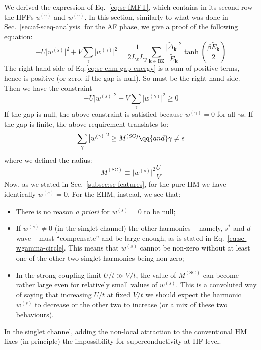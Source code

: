 We derived the expression of Eq.~\eqref{eq:sc-fMFT}, which contains in its second row the HFPs $u^{(\gamma)}$ and $w^{(\gamma)}$. In this section, similarly to what was done in Sec.~\ref{sec:af-sceq-analysis} for the AF phase, we give a proof of the following equation:
\begin{equation}\label{eq:sc-ehm-gap-energy}
	-U \big|
		w^{(s)}
	\big|^2 + V \sum_\gamma \big|
		w^{(\gamma)}
	\big|^2 = \frac{1}{2L_x L_y} \sum_{\mathbf{k}\in\mathrm{BZ}} \frac{\big| \tilde{\Delta}_\mathbf{k} \big|^2 }{\tilde{E}_\mathbf{k}} \tanh(\frac{\beta\tilde{E}_\mathbf{k}}{2})
\end{equation}
The right-hand side of Eq.\eqref{eq:sc-ehm-gap-energy} is a sum of positive terms, hence is positive (or zero, if the gap is null). So must be the right hand side. Then we have the constraint
\[
-U \big|
w^{(s)}
\big|^2 + V \sum_\gamma \big|
w^{(\gamma)}
\big|^2 \ge 0
\]
If the gap is null, the above constraint is satisfied because $w^{(\gamma)}=0$ for all $\gamma$s. If the gap is finite, the above requirement translates to:
\begin{equation}\label{eq:sc-wgamma-circle}
	\sum_{\gamma} \big| w^{(\gamma)} \big|^2 \ge M^{(\mathrm{SC})}
	\qq{and}
	\gamma \neq s
\end{equation}
where we defined the radius:
\[
M^{(\mathrm{SC})} \equiv \big| w^{(s)} \big|^2 \frac U V
\]
Now, as we stated in Sec.~\ref{subsec:sc-features}, for the pure HM we have identically $w^{(s)}=0$. For the EHM, instead, we see that:
\begin{itemize}
	\item There is no reason \textit{a priori} for $w^{(s)}=0$ to be null;
	\item If $w^{(s)}\neq0$ (in the singlet channel) the other harmonics -- namely, $s^*$ and $d$-wave -- must ``compensate'' and be large enough, as is stated in Eq.~\eqref{eq:sc-wgamma-circle}. This means that $w^{(s)}$ cannot be non-zero without at least one of the other two singlet harmonics being non-zero;
	\item In the strong coupling limit $U/t \gg V/t$, the value of $M^{(\mathrm{SC})}$ can become rather large even for relatively small values of $w^{(s)}$. This is a convoluted way of saying that increasing $U/t$ at fixed $V/t$ we should expect the harmonic $w^{(s)}$ to decrease or the other two to increase (or a mix of these two behaviours).
\end{itemize}
In the singlet channel, adding the non-local attraction to the conventional HM fixes (in principle) the impossibility for superconductivity at HF level. 


